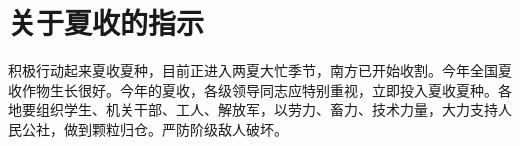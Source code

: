 \section[关于夏收的指示（一九六七年六月三日）]{关于夏收的指示}


积极行动起来夏收夏种，目前正进入两夏大忙季节，南方已开始收割。今年全国夏收作物生长很好。今年的夏收，各级领导同志应特别重视，立即投入夏收夏种。各地要组织学生、机关干部、工人、解放军，以劳力、畜力、技术力量，大力支持人民公社，做到颗粒归仓。严防阶级敌人破坏。


